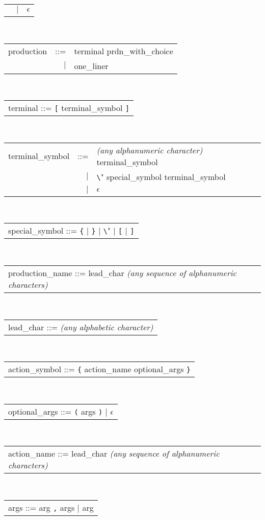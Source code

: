 \begin{center}
\begin{boxed}
\begin{tabular}{lrl}
                  &   $|$ & $\epsilon$
\end{tabular} \\
\begin{tabular}{lrl}
      production & ::= & terminal prdn\_with\_choice \\
                 &   $|$ & one\_liner
\end{tabular} \\
\begin{tabular}{l}
      terminal ::= {\tt [} terminal\_symbol {\tt ]}
\end{tabular} \\
\begin{tabular}{lrl}
      terminal\_symbol & ::= & {\it (any alphanumeric character)} terminal\_symbol \\
                      &   $|$ & \verb"\" special\_symbol terminal\_symbol \\
                      & $|$ & $\epsilon$
\end{tabular} \\
\begin{tabular}{l}
      special\_symbol ::= \verb"{" $|$ \verb"}" $|$ \verb"\" $|$ \verb"[" $|$ \verb"]"
\end{tabular} \\
\begin{tabular}{l}
      production\_name ::= lead\_char {\it (any sequence of alphanumeric characters)}
\end{tabular} \\
\begin{tabular}{l}
      lead\_char ::= {\it (any alphabetic character)}
\end{tabular} \\
\begin{tabular}{l}
      action\_symbol ::= {\tt \{} action\_name optional\_args {\tt \}}
\end{tabular} \\
\begin{tabular}{l}
optional\_args ::= {\tt (} args {\tt )} $|$ $\epsilon$
\end{tabular}\\
\begin{tabular}{l}
      action\_name ::= lead\_char {\it (any sequence of alphanumeric characters)}
\end{tabular} \\
\begin{tabular}{l}
      args ::= arg {\tt ,} args $|$ arg
\end{tabular} \\

\end{boxed}
\end{center}
